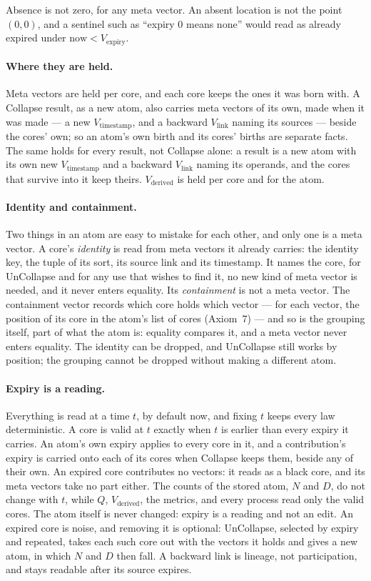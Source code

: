 \documentclass[12pt, a4paper]{article}
\begin{document}
Absence is not zero, for any meta vector. An absent location is not the
point $(0,0)$, and a sentinel such as ``expiry $0$ means none'' would
read as already expired under $\text{now}<V_{\text{expiry}}$.

\paragraph{Where they are held.} Meta vectors are held per core, and each
core keeps the ones it was born with. A Collapse result, as a new atom,
also carries meta vectors of its own, made when it was made --- a new
$V_{\text{timestamp}}$, and a backward $V_{\text{link}}$ naming its
sources --- beside the cores' own; so an atom's own birth and its cores' births are separate facts. The same holds for every result, not Collapse alone: a result is a new atom with its own new $V_{\text{timestamp}}$ and a backward $V_{\text{link}}$ naming its operands, and the cores that survive into it keep theirs. $V_{\text{derived}}$ is held per core and for the atom.

\paragraph{Identity and containment.} Two things in an atom are easy to mistake for each other, and only one is a meta vector. A core's \emph{identity} is read from meta vectors it already carries: the identity key, the tuple of its sort, its source link and its timestamp. It names the core, for UnCollapse and for any use that wishes to find it, no new kind of meta vector is needed, and it never enters equality. Its \emph{containment} is not a meta vector. The containment vector records which core holds which vector --- for each vector, the position of its core in the atom's list of cores (Axiom~7) --- and so is the grouping itself, part of what the atom is: equality compares it, and a meta vector never enters equality. The identity can be dropped, and UnCollapse still works by position; the grouping cannot be dropped without making a different atom.

\paragraph{Expiry is a reading.} Everything is read at a time $t$, by
default now, and fixing $t$ keeps every law deterministic. A core is
valid at $t$ exactly when $t$ is earlier than every expiry it carries. An
atom's own expiry applies to every core in it, and a contribution's
expiry is carried onto each of its cores when Collapse keeps them,
beside any of their own. An expired core contributes no vectors: it
reads as a black core, and its meta vectors take no part either. The
counts of the stored atom, $N$ and $D$, do not change with $t$, while
$Q$, $V_{\text{derived}}$, the metrics, and every process read only the
valid cores. The atom itself is never changed: expiry is a reading and not an edit. An expired core is noise, and removing it is optional: UnCollapse, selected by expiry and repeated, takes each such core out with the vectors it holds and gives a new atom, in which $N$ and $D$ then fall. A backward link is lineage, not participation, and stays
readable after its source expires.
\end{document}
